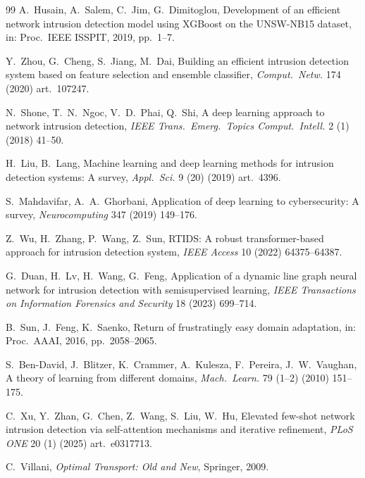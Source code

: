 \documentclass[preprint,12pt,authoryear]{elsarticle}
\begin{document}
\begin{thebibliography}{99}
A.~Husain, A.~Salem, C.~Jim, G.~Dimitoglou, Development of an efficient network
intrusion detection model using XGBoost on the UNSW-NB15 dataset, in: Proc.\ IEEE
ISSPIT, 2019, pp.~1--7.

Y.~Zhou, G.~Cheng, S.~Jiang, M.~Dai, Building an efficient intrusion detection
system based on feature selection and ensemble classifier, \textit{Comput.\ Netw.}
174 (2020) art.~107247.

N.~Shone, T.~N.~Ngoc, V.~D.~Phai, Q.~Shi, A deep learning approach to network
intrusion detection, \textit{IEEE Trans.\ Emerg.\ Topics Comput.\ Intell.} 2 (1)
(2018) 41--50.

H.~Liu, B.~Lang, Machine learning and deep learning methods for intrusion
detection systems: A survey, \textit{Appl.\ Sci.} 9 (20) (2019) art.~4396.

S.~Mahdavifar, A.~A.~Ghorbani, Application of deep learning to cybersecurity: A
survey, \textit{Neurocomputing} 347 (2019) 149--176.

Z.~Wu, H.~Zhang, P.~Wang, Z.~Sun, RTIDS: A robust transformer-based approach for
intrusion detection system, \textit{IEEE Access} 10 (2022) 64375--64387.

G.~Duan, H.~Lv, H.~Wang, G.~Feng, Application of a dynamic line graph neural
network for intrusion detection with semisupervised learning, \textit{IEEE
Transactions on Information Forensics and Security} 18 (2023) 699--714.


B.~Sun, J.~Feng, K.~Saenko, Return of frustratingly easy domain adaptation, in:
Proc.\ AAAI, 2016, pp.~2058--2065.

S.~Ben-David, J.~Blitzer, K.~Crammer, A.~Kulesza, F.~Pereira, J.~W.~Vaughan, A
theory of learning from different domains, \textit{Mach.\ Learn.} 79 (1--2) (2010)
151--175.

C.~Xu, Y.~Zhan, G.~Chen, Z.~Wang, S.~Liu, W.~Hu, Elevated few-shot network
intrusion detection via self-attention mechanisms and iterative refinement,
\textit{PLoS ONE} 20 (1) (2025) art.~e0317713.

C.~Villani, \textit{Optimal Transport: Old and New}, Springer, 2009.


\end{thebibliography}
\end{document}
